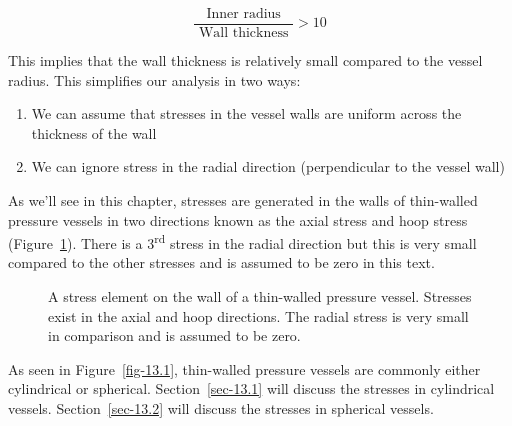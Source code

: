 \documentclass[
  letterpaper,
  DIV=11,
  numbers=noendperiod]{scrreprt}
\providecommand{\tightlist}{%
  \setlength{\itemsep}{0pt}\setlength{\parskip}{0pt}}\usepackage{longtable,booktabs,array}
\theoremstyle{definition}
\theoremstyle{remark}
\begin{document}
\[
\frac{\text { Inner radius }}{\text { Wall thickness }}>10
\]

This implies that the wall thickness is relatively small compared to the
vessel radius. This simplifies our analysis in two ways:

\begin{enumerate}
\def\labelenumi{\arabic{enumi}.}
\tightlist
\item
  We can assume that stresses in the vessel walls are uniform across the
  thickness of the wall
\item
  We can ignore stress in the radial direction (perpendicular to the
  vessel wall)
\end{enumerate}

As we'll see in this chapter, stresses are generated in the walls of
thin-walled pressure vessels in two directions known as the axial stress
and hoop stress (Figure~\ref{fig-13.2}). There is a
3\textsuperscript{rd} stress in the radial direction but this is very
small compared to the other stresses and is assumed to be zero in this
text.

\begin{figure}


\caption{\label{fig-13.2}A stress element on the wall of a thin-walled
pressure vessel. Stresses exist in the axial and hoop directions. The
radial stress is very small in comparison and is assumed to be zero.}

\end{figure}%

As seen in Figure~\ref{fig-13.1}, thin-walled pressure vessels are
commonly either cylindrical or spherical. Section~\ref{sec-13.1} will
discuss the stresses in cylindrical vessels. Section~\ref{sec-13.2} will
discuss the stresses in spherical vessels.
\end{document}
